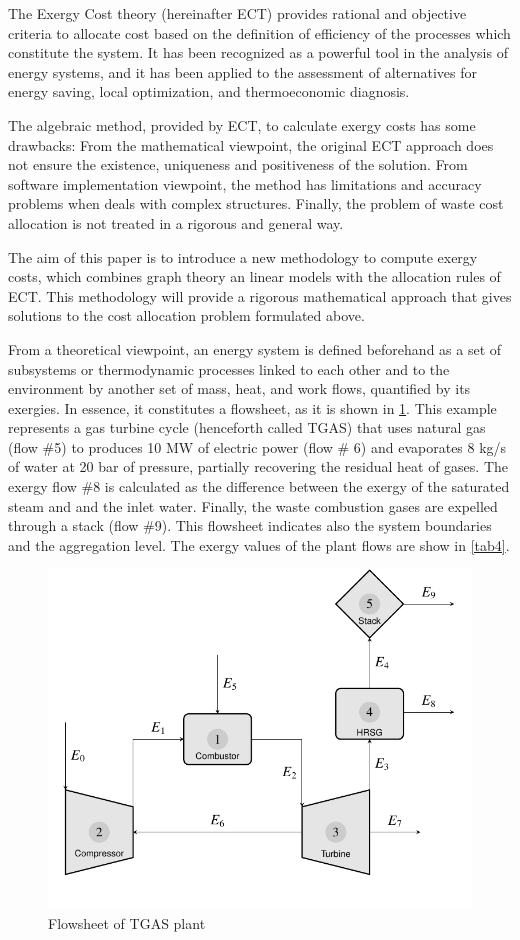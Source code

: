 \documentclass{ecos}
\begin{document}
The Exergy Cost theory \cite{ECT93} (hereinafter ECT) provides rational and objective criteria to allocate cost based on the definition of efficiency of the processes which constitute the system. It has been recognized as a powerful tool in the analysis of energy systems, and it has been applied to the assessment of alternatives for energy saving, local optimization, and thermoeconomic diagnosis.

The algebraic method, provided by ECT, to calculate exergy costs has some drawbacks: From the mathematical viewpoint, the original ECT approach does not ensure the existence, uniqueness and positiveness of the solution. From software implementation viewpoint, the method has limitations and accuracy problems when deals with complex structures. Finally, the problem of waste cost allocation is not treated in a rigorous and general way.

The aim of this paper is to introduce a new methodology to compute exergy costs, which combines graph theory an linear models with the allocation rules of ECT. This methodology will provide a rigorous mathematical approach that gives solutions to the cost allocation problem formulated above.

From a theoretical viewpoint, an energy system is defined beforehand as a set of subsystems or thermodynamic processes linked to each other and to the environment by another set of mass, heat, and work flows, quantified by its exergies. In essence, it constitutes a flowsheet, as it is shown in \cref{fig1}. This example represents a gas turbine cycle (henceforth called TGAS) that uses natural gas (flow \#5) to produces 10 MW of electric power (flow \# 6) and evaporates 8 kg/s of water at 20 bar of pressure, partially recovering the residual heat of gases. The exergy flow \#8 is calculated as the difference between the exergy of the saturated steam and and the inlet water. Finally, the waste combustion gases are expelled through a stack (flow \#9). This flowsheet indicates also the system boundaries and the aggregation level. The exergy values of the plant flows are show in \cref{tab4}.  

\begin{figure}[h]
	\centering
	\includegraphics[width=0.65\linewidth]{tgas.pdf}
	\caption{Flowsheet of TGAS plant}
	\label{fig1}
\end{figure}
\end{document}

